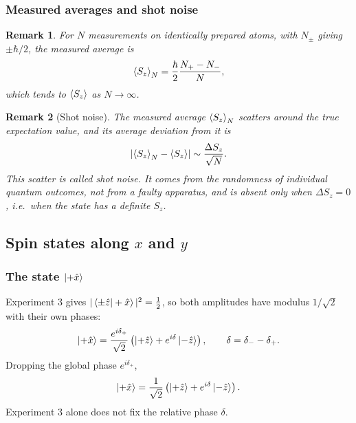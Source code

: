 \documentclass{article}
\newtheorem{remark}{Remark}
\begin{document}
\subsubsection{Measured averages and shot noise}
\begin{remark}
    For $N$ measurements on identically prepared atoms, with $N_\pm$ giving $\pm\hbar/2$, the measured average is
    \begin{equation}
        \braket{S_z}_N = \frac{\hbar}{2}\frac{N_+ - N_-}{N},
    \end{equation}
    which tends to $\braket{S_z}$ as $N \to \infty$.
\end{remark}
\begin{remark}[Shot noise]
    The measured average $\braket{S_z}_N$ scatters around the true expectation value, and its average deviation from it is
    \begin{equation}
        \left|\braket{S_z}_N - \braket{S_z}\right| \sim \frac{\Delta S_z}{\sqrt{N}}.
    \end{equation}
    This scatter is called shot noise. It comes from the randomness of individual quantum outcomes, not from a faulty apparatus, and is absent only when $\Delta S_z = 0$, i.e.\ when the state has a definite $S_z$.
\end{remark}

\subsection{Spin states along \texorpdfstring{$x$}{x} and \texorpdfstring{$y$}{y}}
\label{sec:xy-states}

\subsubsection{The state \texorpdfstring{$\ket{+\hat{x}}$}{|+x>}}
Experiment 3 gives $|\braket{\pm\hat{z}|+\hat{x}}|^2 = \tfrac12$, so both amplitudes have modulus $1/\sqrt{2}$ with their own phases:
\[\ket{+\hat{x}} = \frac{e^{i\delta_{+}}}{\sqrt{2}}\left(\ket{+\hat{z}} + e^{i\delta}\ket{-\hat{z}}\right), \qquad \delta = \delta_{-} - \delta_{+}.\]
Dropping the global phase $e^{i\delta_+}$,
\[\ket{+\hat{x}} = \frac{1}{\sqrt{2}}\left(\ket{+\hat{z}} + e^{i\delta}\ket{-\hat{z}}\right).\]
Experiment 3 alone does not fix the relative phase $\delta$.
\end{document}
